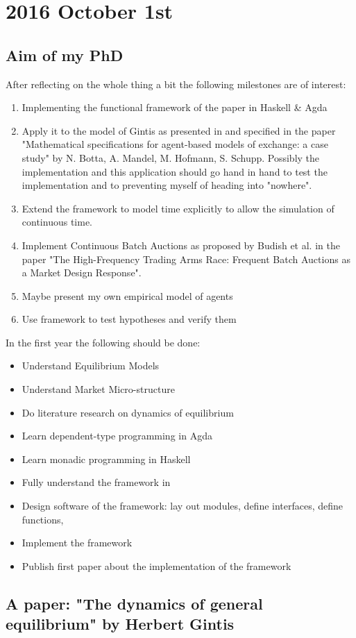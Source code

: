 \section*{2016 October 1st}
\subsection*{Aim of my PhD}
After reflecting on the whole thing a bit the following milestones are of interest:

\begin{enumerate}
\item Implementing the functional framework of the paper \cite{Botta20114025} in Haskell \& Agda
\item Apply it to the model of Gintis as presented in \cite{Gintis2006} and specified in the paper "Mathematical specifications for agent-based
models of exchange: a case study" by N. Botta, A. Mandel, M. Hofmann, S. Schupp. Possibly the implementation and this application should go hand in hand to test the implementation and to preventing myself of heading into "nowhere".
\item Extend the framework to model time explicitly to allow the simulation of continuous time.
\item Implement Continuous Batch Auctions as proposed by Budish et al. in the paper "The High-Frequency Trading Arms Race: Frequent Batch Auctions as a Market Design Response".
\item Maybe present my own empirical model of agents
\item Use framework to test hypotheses and verify them
\end{enumerate}

In the first year the following should be done:

\begin{itemize}
\item Understand Equilibrium Models
\item Understand Market Micro-structure
\item Do literature research on dynamics of equilibrium 
\item Learn dependent-type programming in Agda
\item Learn monadic programming in Haskell
\item Fully understand the framework in \cite{Botta20114025}
\item Design software of the framework: lay out modules, define interfaces, define functions,
\item Implement the framework
\item Publish first paper about the implementation of the framework
\end{itemize}

\bigskip

\subsection*{A paper: "The dynamics of general equilibrium" by Herbert Gintis \cite{gintis_dynamics_2007}}
